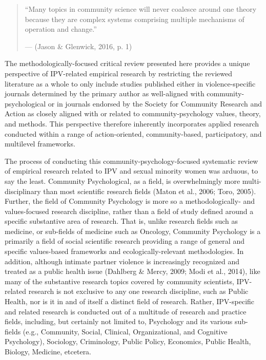 \documentclass[11pt,]{tufte-book}
\begin{document}
\singlespacing

\begin{quote}
``Many topics in community science will never coalesce around one theory
because they are complex systems comprising multiple mechanisms of
operation and change.''

\hfill --- (Jason \& Glenwick, 2016, p. 1)
\end{quote}

\doublespacing

The methodologically-focused critical review presented here provides a
unique perspective of IPV-related empirical research by restricting the
reviewed literature as a whole to only include studies published either
in violence-specific journals determined by the primary author as
well-aligned with community-psychological or in journals endorsed by the
Society for Community Research and Action as closely aligned with or
related to community-psychology values, theory, and methods. This
perspective therefore inherently incorporates applied research conducted
within a range of action-oriented, community-based, participatory, and
multilevel frameworks.

The process of conducting this community-psychology-focused systematic
review of empirical research related to IPV and sexual minority women
was arduous, to say the least. Community Psychological, as a field, is
overwhelmingly more multi-disciplinary than most scientific research
fields (Maton et al., 2006; Toro, 2005). Further, the field of Community
Psychology is more so a methodologically- and values-focused research
discipline, rather than a field of study defined around a specific
substantive area of research. That is, unlike research fields such as
medicine, or sub-fields of medicine such as Oncology, Community
Psychology is a primarily a field of social scientific research
providing a range of general and specific values-based frameworks and
ecologically-relevant methodologies. In addition, although intimate
partner violence is increasingly recognized and treated as a public
health issue (Dahlberg \& Mercy, 2009; Modi et al., 2014), like many of
the substantive research topics covered by community scientists,
IPV-related research is not exclusive to any one research discipline,
such as Public Health, nor is it in and of itself a distinct field of
research. Rather, IPV-specific and related research is conducted out of
a multitude of research and practice fields, including, but certainly
not limited to, Psychology and its various sub-fields (e.g., Community,
Social, Clinical, Organizational, and Cognitive Psychology), Sociology,
Criminology, Public Policy, Economics, Public Health, Biology, Medicine,
etcetera.
\end{document}

